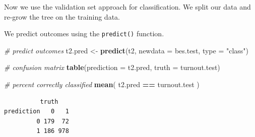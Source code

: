 \documentclass[]{article}
\newenvironment{Shaded}{\begin{snugshade}}{\end{snugshade}}
\newcommand{\CommentTok}[1]{\textcolor[rgb]{0.56,0.35,0.01}{\textit{#1}}}
\newcommand{\DataTypeTok}[1]{\textcolor[rgb]{0.13,0.29,0.53}{#1}}
\newcommand{\DecValTok}[1]{\textcolor[rgb]{0.00,0.00,0.81}{#1}}
\newcommand{\KeywordTok}[1]{\textcolor[rgb]{0.13,0.29,0.53}{\textbf{#1}}}
\newcommand{\NormalTok}[1]{#1}
\newcommand{\OperatorTok}[1]{\textcolor[rgb]{0.81,0.36,0.00}{\textbf{#1}}}
\newcommand{\StringTok}[1]{\textcolor[rgb]{0.31,0.60,0.02}{#1}}
\begin{document}
Now we use the validation set approach for classification. We split our data and re-grow the tree on the training data.

\begin{Shaded}
\end{Shaded}

We predict outcomes using the \texttt{predict()} function.

\begin{Shaded}
\begin{Highlighting}[]
\CommentTok{# predict outcomes}
\NormalTok{t2.pred <-}\StringTok{ }\KeywordTok{predict}\NormalTok{(t2, }\DataTypeTok{newdata =}\NormalTok{ bes.test, }\DataTypeTok{type =} \StringTok{"class"}\NormalTok{)}

\CommentTok{# confusion matrix}
\KeywordTok{table}\NormalTok{(}\DataTypeTok{prediction =}\NormalTok{ t2.pred, }\DataTypeTok{truth =}\NormalTok{ turnout.test)}

\CommentTok{# percent correctly classified}
\KeywordTok{mean}\NormalTok{( t2.pred }\OperatorTok{==}\StringTok{ }\NormalTok{turnout.test )}
\end{Highlighting}
\end{Shaded}

\begin{verbatim}
          truth
prediction   0   1
         0 179  72
         1 186 978
\end{verbatim}
\end{document}
